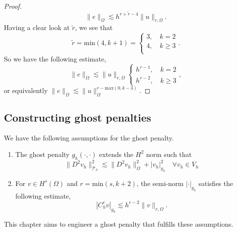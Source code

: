 \documentclass[11pt]{article}
\theoremstyle{remark}
\newcommand{\abs}[1]{\left\lvert #1 \right\rvert}
\renewcommand{\ge}{\geqslant}
\numberwithin{equation}{section}
\begin{document}
\begin{proof}
\begin{equation}
            \| e \|_{\Omega   }^{  } \lesssim h^{r+ \widetilde{r} -4} \| u \|_{ r,\Omega   }^{  }.
        \end{equation}
        Having a clear look at $\widetilde{r}$, we see that \begin{equation}
            \widetilde{r} = \mathrm{min}(4, k+1) = \begin{cases}
                 3, \quad  k=2 \\
                 4, \quad  k\ge 3 \\
            \end{cases}.
        \end{equation}
        So we have the following estimate,\begin{equation}
            \| e \|_{ \Omega  }^{  }  \lesssim  \| u \|_{ r,\Omega  }^{  }  \begin{cases}
                h^{r-1}, \quad k=2 \\
                h^{r-2}, \quad k\ge 3
            \end{cases},
        \end{equation}
        or equivalently $\| e \|_{\Omega   }^{  } \lesssim \| u \|_{\Omega   }^{r- \mathrm{max}(0,k-3)   } $.


\end{proof}



\subsection{Constructing ghost penalties}%
\label{sec:constructing_ghost_penalties}

We have the following assumptions for the ghost penalty.
\begin{enumerate}[label=\textbf{EP\arabic*}]
    \item \label{as:EP1} The ghost penalty $g_{h}( \cdot ,\cdot ) $ extends the $H^{2}$ norm such that
        \begin{equation}
    \| D^2v_{h} \|_{ \mathcal{T} _{h} }^{ 2 }  \lesssim \| D^2 v_{h} \|_{ \Omega  }^{  2} + \abs{ v_{h} } _{g_{h}}^2 \quad \forall v_{h} \in V_{h}
        \end{equation}
\item \label{as:EP2} For $v \in H^{s}( \Omega ) $ and $r = \mathrm{ min} (s,k+2) $, the semi-norm $\abs{ \cdot  }_{g_{h}} $ satisfies the following estimate,
    \begin{equation}
    \abs{ C _{h}^{e} v } _{g_{h}} \lesssim  h^{r-2} \| v \|_{ r,\Omega  }^{  }.
    \end{equation}
\end{enumerate}
This chapter aims to engineer a ghost penalty that fulfills these assumptions.
\end{document}
